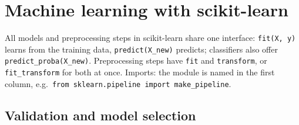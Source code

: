 \documentclass[
  letterpaper,
  DIV=11,
  numbers=noendperiod]{scrreprt}
\begin{document}
\section{Machine learning with
scikit-learn}\label{machine-learning-with-scikit-learn}

All models and preprocessing steps in scikit-learn share one interface:
\texttt{fit(X,\ y)} learns from the training data,
\texttt{predict(X\_new)} predicts; classifiers also offer
\texttt{predict\_proba(X\_new)}. Preprocessing steps have \texttt{fit}
and \texttt{transform}, or \texttt{fit\_transform} for both at once.
Imports: the module is named in the first column,
e.g.~\texttt{from\ sklearn.pipeline\ import\ make\_pipeline}.

\subsection{Validation and model
selection}\label{validation-and-model-selection}
\end{document}
